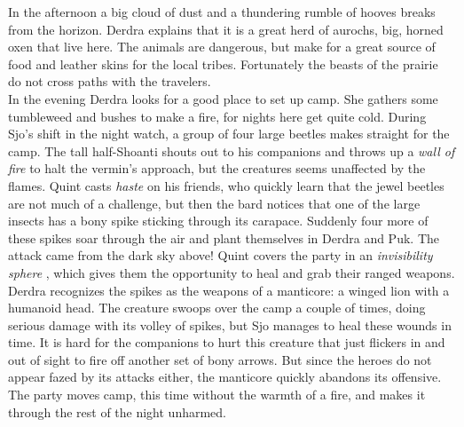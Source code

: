 In the afternoon a big cloud of dust and a thundering rumble of hooves breaks from the horizon. Derdra explains that it is a great herd of aurochs, big, horned oxen that live here. The animals are dangerous, but make for a great source of food and leather skins for the local tribes. Fortunately the beasts of the prairie do not cross paths with the travelers.\\

In the evening Derdra looks for a good place to set up camp. She gathers some tumbleweed and bushes to make a fire, for nights here get quite cold. During Sjo's shift in the night watch, a group of four large beetles makes straight for the camp. The tall half-Shoanti shouts out to his companions and throws up a {\itshape wall of fire} to halt the vermin's approach, but the creatures seems unaffected by the flames. Quint casts  {\itshape haste} on his friends, who quickly learn that the jewel  beetles are not much of a challenge, but then the bard notices that one of the large insects has a bony spike sticking through its carapace. Suddenly four more of these spikes soar through the air and plant themselves in Derdra and Puk. The attack came from the dark sky above! Quint covers the party in an  {\itshape invisibility sphere} , which gives them the opportunity to heal and grab their ranged weapons. Derdra recognizes the spikes as the weapons of a manticore: a winged lion with a humanoid head. The creature swoops over the camp a couple of times, doing serious damage with its volley of spikes, but Sjo manages to heal these wounds in time. It is hard for the companions to hurt this creature that just flickers in and out of sight to fire off another set of bony arrows. But since the heroes do not appear fazed by its attacks either, the manticore quickly abandons its offensive. The party moves camp, this time without the warmth of a fire, and makes it through the rest of the night unharmed. 